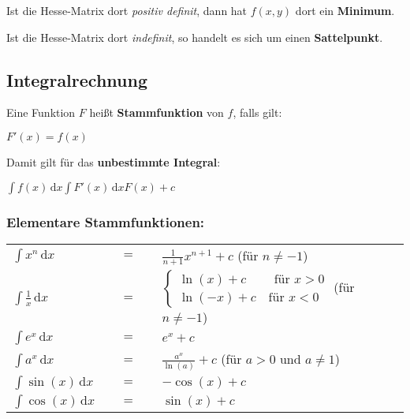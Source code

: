 \documentclass[9pt,ngerman,a4paper,landscape]{scrartcl}
\providecommand{\tightlist}{%
  \setlength{\itemsep}{0pt}\setlength{\parskip}{0pt}}
\begin{document}
\begin{multicols}{3}
\begin{description}
Ist die Hesse-Matrix dort \emph{positiv definit}, dann hat \(f(x,y)\)
dort ein \textbf{Minimum}.

Ist die Hesse-Matrix dort \emph{indefinit}, so handelt es sich um einen
\textbf{Sattelpunkt}.
\end{description}

\hypertarget{integralrechnung}{%
\subsection{Integralrechnung}\label{integralrechnung}}

\begin{description}
\tightlist
\item[Stammfunktion]
Eine Funktion \(F\) heißt \textbf{Stammfunktion} von \(f\), falls gilt:

\(\displaystyle F'(x) = f(x)\)
\item[Unbestimmtest Integral]
Damit gilt für das \textbf{unbestimmte Integral}:

\(\displaystyle \int f(x) \,\textrm{d}x \int F'(x) \,\textrm{d}x F(x) + c\)
\end{description}

\hypertarget{elementare-stammfunktionen}{%
\subsubsection{Elementare
Stammfunktionen:}\label{elementare-stammfunktionen}}

\begin{tabular}{ l c l }
    $\displaystyle\int x^n \,\textrm{d}x$           & $\quad=\quad$ & $\displaystyle\frac{1}{n+1}x^{n+1}+c$ \hfil (für $n\neq-1$) \\[0.75em]
    $\displaystyle\int \frac1x \,\textrm{d}x$       & $\quad=\quad$ & $\displaystyle\begin{cases}\ln(x) + c \phantom{-}\quad \text{für } x > 0\\ \ln(-x) + c \quad \text{für } x < 0 \end{cases}$ \hfil (für $n\neq-1$) \\[0.75em]
    $\displaystyle\int e^x \,\textrm{d}x$           & $\quad=\quad$ & $\displaystyle e^x+c$\\[0.75em]
    $\displaystyle\int a^x \,\textrm{d}x$           & $\quad=\quad$ & $\displaystyle \frac{a^x}{\ln(a)}+c$ \hfil (für $a>0$ und $a\neq 1$)\\[0.75em]
    $\displaystyle\int \sin(x) \,\textrm{d}x$           & $\quad=\quad$ & $\displaystyle -\cos(x)+c$\\[0.75em]
    $\displaystyle\int \cos(x) \,\textrm{d}x$           & $\quad=\quad$ & $\displaystyle \sin(x)+c$\\[0.75em]
\end{tabular}


\end{multicols}
\end{document}
